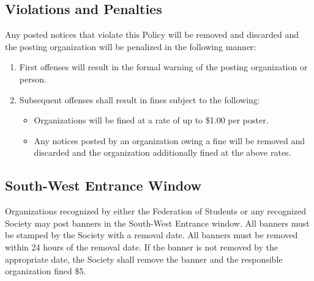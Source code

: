 \subsection{Violations and Penalties}
Any posted notices that violate this Policy will be removed and discarded and the posting organization will be penalized in the following manner:
\begin{enumerate}
\item First offenses will result in the formal warning of the posting organization or person.
\item Subsequent offenses shall result in fines subject to the following:
	\begin{itemize}
	\item Organizations will be fined at a rate of up to \$1.00 per poster.
	\item Any notices posted by an organization owing a fine will be removed and discarded and the organization additionally fined at the above rates.
	\end{itemize}
\end{enumerate}
	

\subsection{South-West Entrance Window}
Organizations recognized by either the Federation of Students or any recognized Society may post banners in the South-West Entrance window.
All banners must be stamped by the Society with a removal date.
All banners must be removed within 24 hours of the removal date. If the banner is not removed by the appropriate date, the Society shall remove the banner and the responsible organization fined \$5.